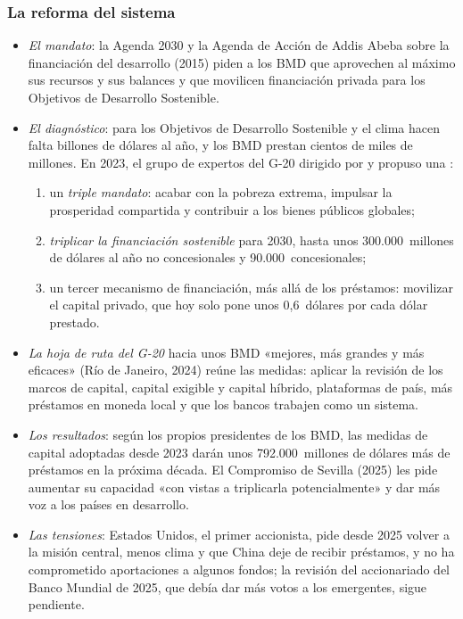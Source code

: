 \documentclass[11pt]{article}
\begin{document}
\subsubsection{La reforma del sistema}\label{sec:reforma}

\begin{itemize}
\item \emph{El mandato}: la Agenda 2030 y la Agenda de Acción de Addis Abeba sobre la financiación del desarrollo (2015) piden a los BMD que aprovechen al máximo sus recursos y sus balances y que movilicen financiación privada para los Objetivos de Desarrollo Sostenible\nocite{ONU2015AddisAbeba}.
\item \emph{El diagnóstico}: para los Objetivos de Desarrollo Sostenible y el clima hacen falta billones de dólares al año, y los BMD prestan cientos de miles de millones. En 2023, el grupo de expertos del G-20 dirigido por  y  propuso una \nocite{G202023IEG}:
  \begin{enumerate}
  \item un \emph{triple mandato}: acabar con la pobreza extrema, impulsar la prosperidad compartida y contribuir a los bienes públicos globales;
  \item \emph{triplicar la financiación sostenible} para 2030, hasta unos 300.000~millones de dólares al año no concesionales y 90.000~concesionales;
  \item un tercer mecanismo de financiación, más allá de los préstamos: movilizar el capital privado, que hoy solo pone unos 0,6~dólares por cada dólar prestado.
  \end{enumerate}
\item \emph{La hoja de ruta del G-20} hacia unos BMD «mejores, más grandes y más eficaces» (Río de Janeiro, 2024) reúne las medidas: aplicar la revisión de los marcos de capital, capital exigible y capital híbrido, plataformas de país, más préstamos en moneda local y que los bancos trabajen como un sistema\nocite{G202024Hoja}.
\item \emph{Los resultados}: según los propios presidentes de los BMD, las medidas de capital adoptadas desde 2023 darán unos 792.000~millones de dólares más de préstamos en la próxima década\nocite{BMD2026Declaracion}. El Compromiso de Sevilla (2025) les pide aumentar su capacidad «con vistas a triplicarla potencialmente» y dar más voz a los países en desarrollo\nocite{ONU2025Sevilla}.
\item \emph{Las tensiones}: Estados Unidos, el primer accionista, pide desde 2025 volver a la misión central, menos clima y que China deje de recibir préstamos, y no ha comprometido aportaciones a algunos fondos; la revisión del accionariado del Banco Mundial de 2025, que debía dar más votos a los emergentes, sigue pendiente\nocite{TesoroEEUU2025Bessent,G202025Johannesburgo}.
\end{itemize}
\end{document}
